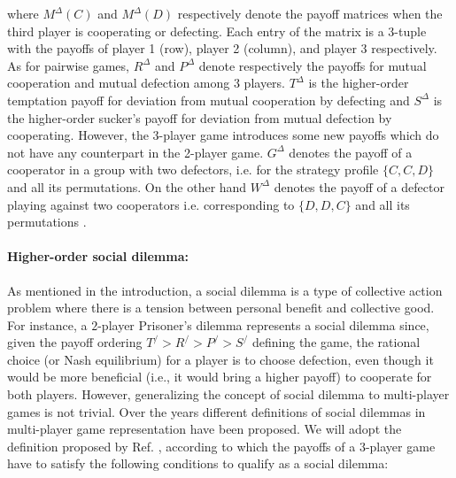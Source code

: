 \documentclass[a4paper,pre,reqno,superscriptaddress,twocolumn, floatfix]{revtex4}
\begin{document}
where $M^{\Delta}(C)$ and $M^{\Delta}(D)$ respectively denote the payoff matrices when the third player is cooperating or defecting. 
%
%
Each entry of the matrix is a $3$-tuple with the payoffs of player 1 (row), player 2 (column), and player 3 respectively. As for pairwise games, $R^{\Delta}$ and $P^{\Delta}$ denote respectively the payoffs for mutual cooperation and mutual defection among 3 players. $T^{\Delta}$ is the higher-order temptation payoff for deviation from mutual cooperation by defecting and $S^{\Delta}$ is the higher-order sucker's payoff for deviation from mutual defection by cooperating. However, the 3-player game introduces some new payoffs which do not have any counterpart in the 2-player game. $G^{\Delta}$ denotes the payoff of a cooperator in a group with two defectors, i.e. for the strategy profile $\{C, C, D\}$ and all its permutations. On the other hand $W^{\Delta}$ denotes the payoff of a defector playing against two cooperators i.e. corresponding to $\{D, D, C\}$ and all its permutations \cite{civilini_explosive_2024}.

\vspace{1em}
\paragraph*{Higher-order social dilemma:} As mentioned in the introduction, a social dilemma is a type of collective action problem where there is a tension between personal benefit and collective good.
%
For instance, a $2$-player Prisoner's dilemma represents a social dilemma since, given the payoff ordering $T^/>R^/>P^/>S^/$ defining the game, the rational choice (or Nash equilibrium) for a player is to choose defection, even though it would be more beneficial (i.e., it would bring a higher payoff) to cooperate for both players. 
%
However, generalizing the concept of social dilemma to multi-player games is not trivial. Over the years different definitions \cite{kerr2004altruism, pena_ordering_2016} of social dilemmas in multi-player game representation have been proposed. We will adopt the definition proposed by Ref. \cite{ broom_generalized_2019}, according to which the payoffs of a $3$-player game have to satisfy the following conditions to qualify as a social dilemma:
\end{document}
